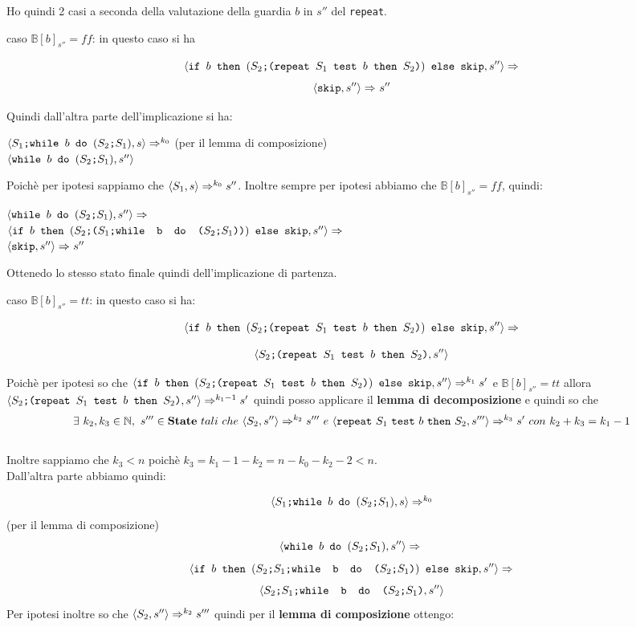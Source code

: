 {\begin{itemize}
	Ho quindi 2 casi a seconda della valutazione della guardia $b$ in $s''$ del
	\texttt{repeat}.
	

		\subitem caso $\mathbb{B}[b]_{s''}=ff$: in questo caso si ha 

		\[ \confSs{\ifABC{b}{(\concat{$S_2$}{(\repeatSbS{$S_1$}{$b$}{$S_2$})})}
		{\skipistr}}{s''}\Rar{} \]
		\[ \confSs{\skipistr}{s''}\Rar{}s'' \]

		Quindi dall'altra parte dell'implicazione si ha:
		\begin{center}
		$\confSs{\PDef{}}{s}\Rar{k_0}$ (per il lemma di composizione)\\
		$\confSs{\wbS{b}{(\concat{$S_2$}{$S_1$})}}{s''}$
		\end{center}
		Poichè per ipotesi sappiamo che $\confSs{S_1}{s}\Rar{k_0}s''$. Inoltre
		sempre per ipotesi abbiamo che $\mathbb{B}[b]_{s''}=ff$, quindi:
		\begin{center}
		$\confSs{\wbS{b}{(\concat{$S_2$}{$S_1$})}}{s''}\Rar{}$\\
		$\confSs{\ifABC{b}{(\concat{$S_2$}{(\concat{$S_1$}
		{\wbS{b}{(\concat{$S_2$}{$S_1$})}})})}{\skipistr}}{s''}\Rar{}$\\
		$\confSs{\skipistr}{s''}\Rar{}s''$
		\end{center}
		Ottenedo lo stesso stato finale quindi dell'implicazione di partenza.

		\subitem caso $\mathbb{B}[b]_{s''}=tt$: in questo caso si ha:

		\[ \confSs{\ifABC{b}{(\concat{$S_2$}{(\repeatSbS{$S_1$}{$b$}{$S_2$})})}
		{\skipistr}}{s''}\Rar{} \]
	
		\[ \confSs{\concat{$S_2$}{(\repeatSbS{$S_1$}{$b$}{$S_2$})}}{s''} \]

		Poichè per ipotesi so che $\confSs{\ifABC{b}{(\concat{$S_2$}
		{(\repeatSbS{$S_1$}{$b$}{$S_2$})})}{\skipistr}}{s''}\Rar{k_1}s'$ e 
		$\mathbb{B}[b]_{s''}=tt$ allora 
		$\confSs{\concat{$S_2$}{(\repeatSbS{$S_1$}{$b$}{$S_2$})}}{s''}
		\Rar{k_1-1}s'$ quindi posso applicare il \textbf{lemma di 
		decomposizione} e quindi so che
		\[ \exists{}~k_2,k_3\in{}\mathbb{N},~ s'''\in{}\states{}~tali~che~
		\confSs{S_2}{s''}\Rar{k_2}s'''~e~\confSs{\repeatSbS{S_1}{b}{S_2}}
		{s'''}\Rar{k_3}s'~con~k_2+k_3=k_1-1 \] \\
		Inoltre sappiamo che $k_3<n$ poichè $k_3=k_1-1-k_2=n-k_0-k_2-2<n$.\\
		Dall'altra parte abbiamo quindi:
	
		\[ \confSs{\PDef{}}{s}\Rar{k_0}\] (per il lemma di composizione)\\
		\[\confSs{\wbS{b}{(\concat{$S_2$}{$S_1$})}}{s''}\Rar{}\\ \]
		\[\confSs{\ifABC{b}{(\concat{\concat{$S_2$}{$S_1$}}
		{\wbS{b}{(\concat{$S_2$}{$S_1$})}})}{\skipistr}}{s''}\Rar{}\]
		\[\confSs{\concat{\concat{$S_2$}{$S_1$}}
		{\wbS{b}{(\concat{$S_2$}{$S_1$})}}}{s''}\]
		Per ipotesi inoltre so che $\confSs{S_2}{s''}\Rar{k_2}s'''$ quindi per
		il \textbf{lemma di composizione} ottengo:
	

\end{itemize}}

